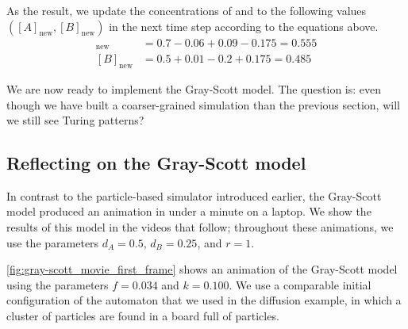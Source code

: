 As the result, we update the concentrations of  and  to the following values $([A]_{\text{new}}, [B]_{\text{new}})$ in the next time step according to the equations above.
\begin{align*}
[A]_{\text{new}} & = 0.7 - 0.06 + 0.09 - 0.175 = 0.555\\
[B]_{\text{new}} & = 0.5 + 0.01 - 0.2 + 0.175 = 0.485
\end{align*}

We are now ready to implement the Gray-Scott model. The question is: even though we have built a coarser-grained simulation than the previous section, will we still see Turing patterns?

\FloatBarrier
{}
\subsection{Reflecting on the Gray-Scott model}

In contrast to the particle-based simulator introduced earlier, the Gray-Scott model produced an animation in under a minute on a laptop. We show the results of this model in the videos that follow; throughout these animations, we use the parameters $d_A = 0.5$, $d_B = 0.25$, and $r = 1$.

\autoref{fig:gray-scott_movie_first_frame} shows an animation of the Gray-Scott model using the parameters  $f = 0.034$ and $k = 0.100$. We use a comparable initial configuration of the automaton that we used in the diffusion example, in which a cluster of  particles are found in a board full of  particles.\\

